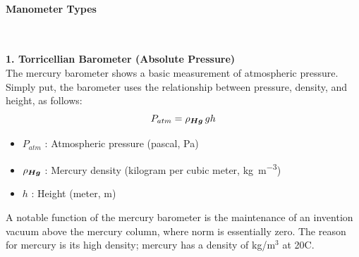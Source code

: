 \documentclass{article}
\begin{document}
\paragraph{Manometer Types}\mbox{}\\[1em]
\noindent
\begin{minipage}{0.65\textwidth}
	\small\textbf{1. Torricellian Barometer (Absolute Pressure)}\\[8pt]	
	\large The mercury barometer shows a basic measurement of atmospheric pressure. Simply put, the barometer uses the relationship between pressure, density, and height, as follows: 
	\begin{equation}
		P_{atm} = \rho_{\tiny \bm{Hg}}\, g  h
	\end{equation}
	\begin{itemize}[itemsep=-1mm]
		\item $P_{atm}$ : Atmospheric pressure (pascal, \si{\Pa})
		\item $\rho_{\tiny \bm{Hg}}$ : Mercury density (kilogram per cubic meter, \si{\kg\per\m\cubed})
		\item $h$ : Height (meter, \si{\m})
	\end{itemize}
	 A notable function of the mercury barometer is the maintenance of an invention vacuum above the mercury column, where norm is essentially zero. The reason for mercury is its high density; mercury has a density of kg/m$^3$ at 20\textdegree C.
\end{minipage}\hfill
\end{document}
